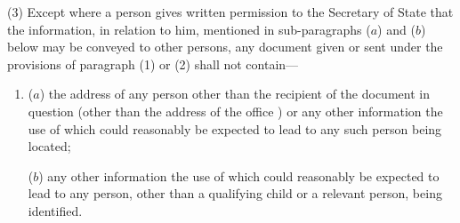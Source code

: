 \documentclass[a4paper,12pt]{article}
\begin{document}
(3) Except where a person gives written permission to the Secretary of State that the information, in relation to him, mentioned in sub-paragraphs ($a$) and ($b$) below may be conveyed to other persons, any document given or sent under the provisions of paragraph (1) or (2) shall not contain—
\begin{enumerate}\item[]
($a$) the address of any person other than the recipient of the document in question (other than the address of the office 
)  %
or any other information the use of which could reasonably be expected to lead to any such person being located;

($b$) any other information the use of which could reasonably be expected to lead to any person, other than a qualifying child or a relevant person, being identified.
\end{enumerate}
\end{document}
